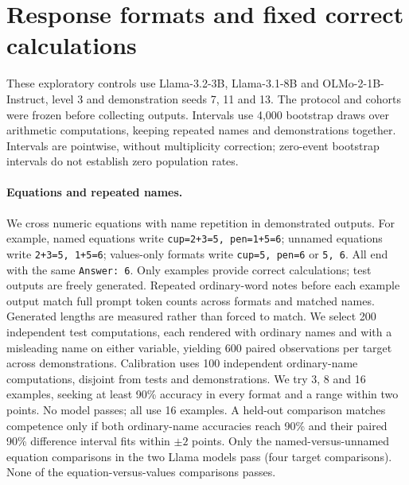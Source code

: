 \section{Response formats and fixed correct calculations}
\label{app:round7-controls}
These exploratory controls use Llama-3.2-3B, Llama-3.1-8B and OLMo-2-1B-Instruct, level 3 and demonstration seeds 7, 11 and 13. The protocol and cohorts were frozen before collecting outputs. Intervals use 4,000 bootstrap draws over arithmetic computations, keeping repeated names and demonstrations together. Intervals are pointwise, without multiplicity correction; zero-event bootstrap intervals do not establish zero population rates.
\paragraph{Equations and repeated names.}
We cross numeric equations with name repetition in demonstrated outputs. For example, named equations write \texttt{cup=2+3=5, pen=1+5=6}; unnamed equations write \texttt{2+3=5, 1+5=6}; values-only formats write \texttt{cup=5, pen=6} or \texttt{5, 6}. All end with the same \texttt{Answer: 6}. Only examples provide correct calculations; test outputs are freely generated. Repeated ordinary-word notes before each example output match full prompt token counts across formats and matched names. Generated lengths are measured rather than forced to match.
We select 200 independent test computations, each rendered with ordinary names and with a misleading name on either variable, yielding 600 paired observations per target across demonstrations. Calibration uses 100 independent ordinary-name computations, disjoint from tests and demonstrations. We try 3, 8 and 16 examples, seeking at least 90\% accuracy in every format and a range within two points. No model passes; all use 16 examples. A held-out comparison matches competence only if both ordinary-name accuracies reach 90\% and their paired 90\% difference interval fits within $\pm2$ points. Only the named-versus-unnamed equation comparisons in the two Llama models pass (four target comparisons). None of the equation-versus-values comparisons passes.
